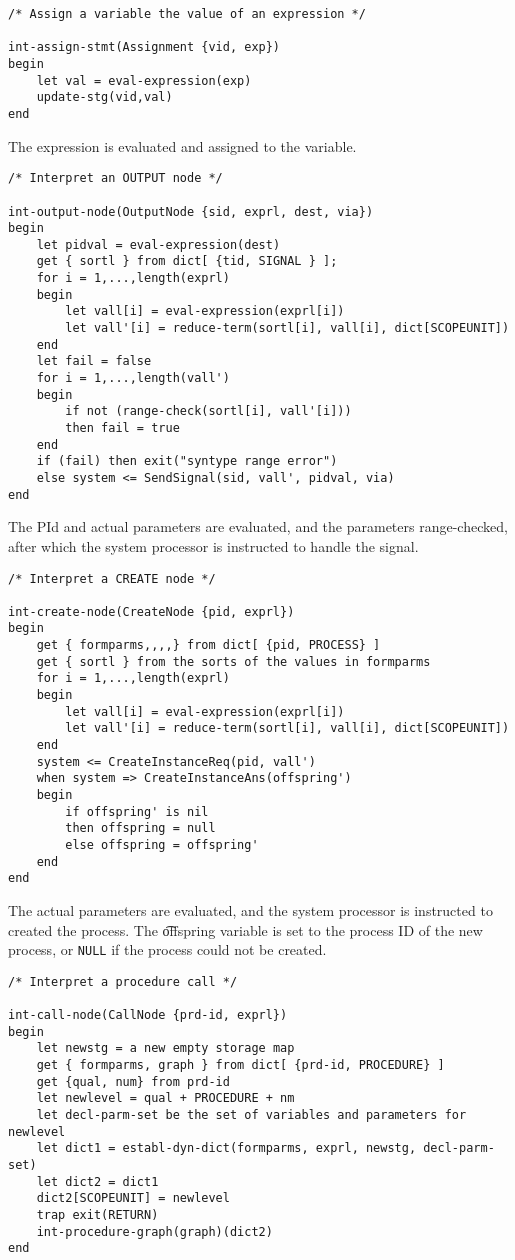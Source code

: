 \begin{verbatim}
/* Assign a variable the value of an expression */

int-assign-stmt(Assignment {vid, exp})
begin
    let val = eval-expression(exp)
    update-stg(vid,val)
end
\end{verbatim}

The expression is evaluated and assigned to the variable.

\begin{verbatim}
/* Interpret an OUTPUT node */

int-output-node(OutputNode {sid, exprl, dest, via})
begin
    let pidval = eval-expression(dest)
    get { sortl } from dict[ {tid, SIGNAL } ];
    for i = 1,...,length(exprl)
    begin
	    let vall[i] = eval-expression(exprl[i])
	    let vall'[i] = reduce-term(sortl[i], vall[i], dict[SCOPEUNIT])
    end
    let fail = false
    for i = 1,...,length(vall')
    begin
        if not (range-check(sortl[i], vall'[i]))
        then fail = true
    end
    if (fail) then exit("syntype range error")
    else system <= SendSignal(sid, vall', pidval, via)
end
\end{verbatim}

The PId and actual parameters are evaluated, and the parameters
range-checked, after which the system processor is instructed to
handle the signal.

\begin{verbatim}
/* Interpret a CREATE node */

int-create-node(CreateNode {pid, exprl})
begin
    get { formparms,,,,} from dict[ {pid, PROCESS} ]
    get { sortl } from the sorts of the values in formparms
    for i = 1,...,length(exprl)
    begin
	    let vall[i] = eval-expression(exprl[i])
	    let vall'[i] = reduce-term(sortl[i], vall[i], dict[SCOPEUNIT])
    end
    system <= CreateInstanceReq(pid, vall')
    when system => CreateInstanceAns(offspring')
    begin
        if offspring' is nil
        then offspring = null
        else offspring = offspring'
    end
end
\end{verbatim}

The actual parameters are evaluated, and the system processor is
instructed to created the process. The {\t offspring} variable is set
to the process ID of the new process, or {\tt NULL} if the process
could not be created.

\begin{verbatim}
/* Interpret a procedure call */

int-call-node(CallNode {prd-id, exprl})
begin
    let newstg = a new empty storage map
    get { formparms, graph } from dict[ {prd-id, PROCEDURE} ]
    get {qual, num} from prd-id
    let newlevel = qual + PROCEDURE + nm
    let decl-parm-set be the set of variables and parameters for newlevel
    let dict1 = establ-dyn-dict(formparms, exprl, newstg, decl-parm-set)
    let dict2 = dict1
    dict2[SCOPEUNIT] = newlevel
    trap exit(RETURN)
    int-procedure-graph(graph)(dict2)
end
\end{verbatim}

